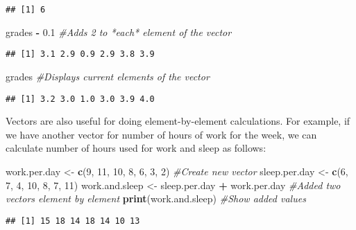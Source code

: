 \documentclass[
]{krantz}
\makeatletter
\newenvironment{Shaded}{\begin{snugshade}}{\end{snugshade}}
\newcommand{\CommentTok}[1]{\textcolor[rgb]{0.37,0.37,0.37}{\textit{#1}}}
\newcommand{\DecValTok}[1]{\textcolor[rgb]{0.06,0.06,0.06}{#1}}
\newcommand{\FloatTok}[1]{\textcolor[rgb]{0.06,0.06,0.06}{#1}}
\newcommand{\KeywordTok}[1]{\textcolor[rgb]{0.27,0.27,0.27}{\textbf{#1}}}
\newcommand{\NormalTok}[1]{#1}
\newcommand{\OperatorTok}[1]{\textcolor[rgb]{0.43,0.43,0.43}{\textbf{#1}}}
\newcommand{\StringTok}[1]{\textcolor[rgb]{0.5,0.5,0.5}{#1}}
\newenvironment{kframe}{%
\medskip{}
\setlength{\fboxsep}{.8em}
 \def\at@end@of@kframe{}%
 \ifinner\ifhmode%
  \def\at@end@of@kframe{\end{minipage}}%
  \begin{minipage}{\columnwidth}%
 \fi\fi%
 \def\FrameCommand##1{\hskip\@totalleftmargin \hskip-\fboxsep
 \colorbox{shadecolor}{##1}\hskip-\fboxsep
     \hskip-\linewidth \hskip-\@totalleftmargin \hskip\columnwidth}%
 \MakeFramed {\advance\hsize-\width
   \@totalleftmargin\z@ \linewidth\hsize
   \@setminipage}}%
 {\par\unskip\endMakeFramed%
 \at@end@of@kframe}
\renewenvironment{Shaded}{\begin{kframe}}{\end{kframe}}
\makeatother
\begin{document}
\begin{verbatim}
## [1] 6
\end{verbatim}

\begin{Shaded}
\begin{Highlighting}[]
\NormalTok{grades }\OperatorTok{-}\StringTok{ }\FloatTok{0.1} \CommentTok{#Adds 2 to *each* element of the vector }
\end{Highlighting}
\end{Shaded}

\begin{verbatim}
## [1] 3.1 2.9 0.9 2.9 3.8 3.9
\end{verbatim}

\begin{Shaded}
\begin{Highlighting}[]
\NormalTok{grades }\CommentTok{#Displays current elements of the vector}
\end{Highlighting}
\end{Shaded}

\begin{verbatim}
## [1] 3.2 3.0 1.0 3.0 3.9 4.0
\end{verbatim}

Vectors are also useful for doing element-by-element calculations. For example, if we have another vector for number of hours of work for the week, we can calculate number of hours used for work and sleep as follows:

\begin{Shaded}
\begin{Highlighting}[]
\NormalTok{work.per.day <-}\StringTok{ }\KeywordTok{c}\NormalTok{(}\DecValTok{9}\NormalTok{, }\DecValTok{11}\NormalTok{, }\DecValTok{10}\NormalTok{, }\DecValTok{8}\NormalTok{, }\DecValTok{6}\NormalTok{, }\DecValTok{3}\NormalTok{, }\DecValTok{2}\NormalTok{) }\CommentTok{#Create new vector}
\NormalTok{sleep.per.day <-}\StringTok{ }\KeywordTok{c}\NormalTok{(}\DecValTok{6}\NormalTok{, }\DecValTok{7}\NormalTok{, }\DecValTok{4}\NormalTok{, }\DecValTok{10}\NormalTok{, }\DecValTok{8}\NormalTok{, }\DecValTok{7}\NormalTok{, }\DecValTok{11}\NormalTok{)}
\NormalTok{work.and.sleep <-}\StringTok{ }\NormalTok{sleep.per.day }\OperatorTok{+}\StringTok{ }\NormalTok{work.per.day }
\CommentTok{#Added two vectors element by element}
\KeywordTok{print}\NormalTok{(work.and.sleep) }\CommentTok{#Show added values}
\end{Highlighting}
\end{Shaded}

\begin{verbatim}
## [1] 15 18 14 18 14 10 13
\end{verbatim}
\end{document}
